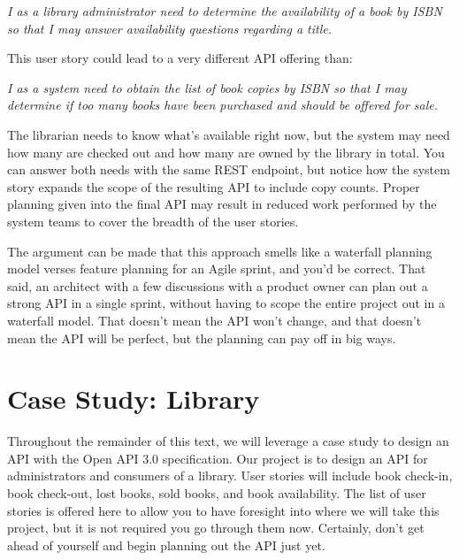 \textit{I as a library administrator need to determine the availability of a book by ISBN so that I may answer availability questions regarding a title.}

This user story could lead to a very different API offering than:

\textit{I as a system need to obtain the list of book copies by ISBN so that I may determine if too many books have been purchased and should be offered for sale.}

The librarian needs to know what's available right now, but the system may need how many are checked out and how many are owned by the library in total.  You can answer both needs with the same REST endpoint, but notice how the system story expands the scope of the resulting API to include copy counts.  Proper planning given into the final API may result in reduced work performed by the system teams to cover the breadth of the user stories.

The argument can be made that this approach smells like a waterfall planning model verses feature planning for an Agile sprint, and you'd be correct.  That said, an architect with a few discussions with a product owner can plan out a strong API in a single sprint, without having to scope the entire project out in a waterfall model.  That doesn't mean the API won't change, and that doesn't mean the API will be perfect, but the planning can pay off in big ways.

\section{Case Study: Library}

Throughout the remainder of this text, we will leverage a case study to design an API with the Open API 3.0 specification.  Our project is to design an API for administrators and consumers of a library.  User stories will include book check-in, book check-out, lost books, sold books, and book availability.  The list of user stories is offered here to allow you to have foresight into where we will take this project, but it is not required you go through them now.  Certainly, don't get ahead of yourself and begin planning out the API just yet.


